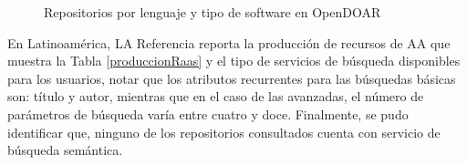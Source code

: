 \begin{figure}[!ht]
    \centering
    \caption{Repositorios por lenguaje y tipo de software en OpenDOAR} %
    \label{opendoar_estadisticas_2}
\end{figure}

En Latinoam\'erica, LA Referencia reporta la producci\'on de recursos de AA que muestra la Tabla \ref{produccionRaas} y el tipo de servicios de b\'usqueda disponibles para los usuarios, notar que los atributos recurrentes para las b\'usquedas b\'asicas son: t\'itulo y autor, mientras que en el caso de las avanzadas, el n\'umero de par\'ametros de b\'usqueda var\'ia entre cuatro y doce. Finalmente, se pudo identificar que, ninguno de los repositorios consultados cuenta con  servicio de b\'usqueda sem\'antica.


